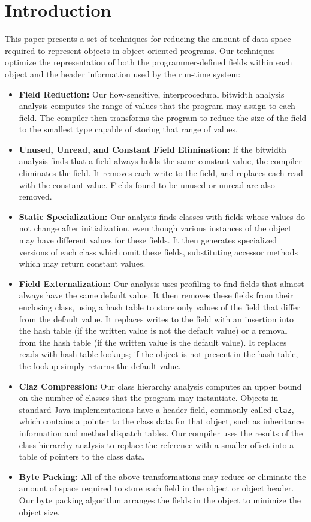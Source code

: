 \documentclass[oribibl]{llncs}
\begin{document}
\section{Introduction}
%
This paper presents a set of techniques for reducing the
amount of data space required to represent objects
in object-oriented programs. Our techniques optimize
the representation of both the programmer-defined fields
within each object and the header information used by the
run-time system:
\begin{itemize}
\item {\bf Field Reduction:} 
Our flow-sensitive, interprocedural bitwidth analysis
analysis computes the range of values that the program
may assign to each field. The compiler then transforms the program
to reduce the size of the field to the smallest type
capable of storing that range of values. 
\item {\bf Unused, Unread, and Constant Field Elimination:} 
If the bitwidth analysis finds that a field always holds
the same constant value, the compiler eliminates the field. 
It removes each write to the field, and replaces each read
with the constant value.  Fields found to be unused or unread are
also removed.
\item {\bf Static Specialization:} Our analysis finds 
classes with fields whose values do not change after initialization,
even though various instances of the object may
have different values for these fields. It then generates 
specialized versions of each class which omit these fields,
substituting accessor methods which may return constant values.
\item {\bf Field Externalization:} Our analysis uses profiling
to find fields that almost always have the same default value. 
It then removes these fields from their enclosing class, 
using a hash table to store only values of the field that differ
from the default value. It replaces writes to the field with
an insertion into the hash table (if the written value is not the
default value) or a removal from the hash table (if the written value
is the default value). It replaces reads with hash table lookups; 
if the object is not present in the hash table, the lookup simply
returns the default value. 
\item {\bf Claz Compression:} Our class hierarchy analysis
computes an upper bound on the number of classes that the
program may instantiate. Objects in standard 
Java implementations have a header field, commonly called {\tt claz},
which contains a pointer
to the class data for that object,
such as inheritance information and method dispatch tables.
Our compiler uses the results of the class
hierarchy analysis to replace the reference with a smaller
offset into a table of pointers to the class data. 
\item {\bf Byte Packing:} All of the above transformations may
reduce or eliminate the amount of space required to store each
field in the object or object header. Our byte packing algorithm
arranges the fields in the object to minimize the object size.
\end{itemize}
\end{document}

